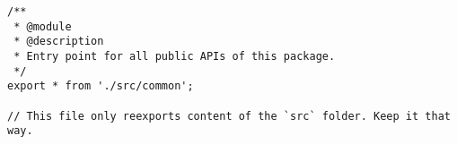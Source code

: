 \begin{verbatim}
/**
 * @module
 * @description
 * Entry point for all public APIs of this package.
 */
export * from './src/common';

// This file only reexports content of the `src` folder. Keep it that way.
\end{verbatim}
